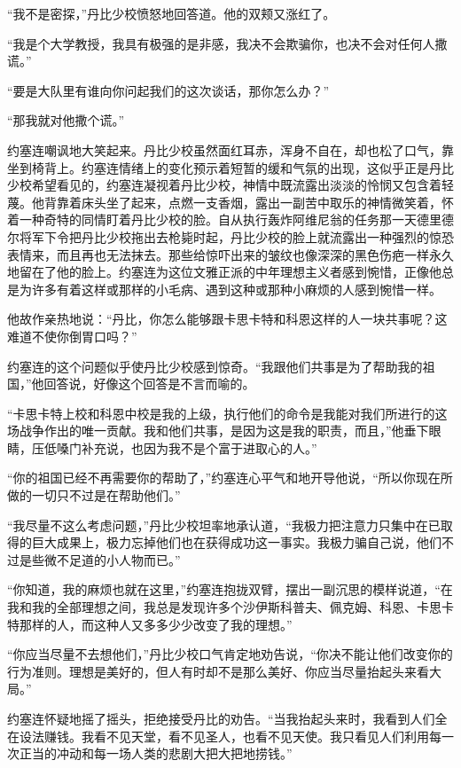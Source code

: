     “我不是密探，”丹比少校愤怒地回答道。他的双颊又涨红了。

    “我是个大学教授，我具有极强的是非感，我决不会欺骗你，也决不会对任何人撒谎。”

    “要是大队里有谁向你问起我们的这次谈话，那你怎么办？”

    “那我就对他撒个谎。”

    约塞连嘲讽地大笑起来。丹比少校虽然面红耳赤，浑身不自在，却也松了口气，靠坐到椅背上。约塞连情绪上的变化预示着短暂的缓和气氛的出现，这似乎正是丹比少校希望看见的，约塞连凝视着丹比少校，神情中既流露出淡淡的怜悯又包含着轻蔑。他背靠着床头坐了起来，点燃一支香烟，露出一副苦中取乐的神情微笑着，怀着一种奇特的同情盯着丹比少校的脸。自从执行轰炸阿维尼翁的任务那一天德里德尔将军下令把丹比少校拖出去枪毙时起，丹比少校的脸上就流露出一种强烈的惊恐表情来，而且再也无法抹去。那些给惊吓出来的皱纹也像深深的黑色伤疤一样永久地留在了他的脸上。约塞连为这位文雅正派的中年理想主义者感到惋惜，正像他总是为许多有着这样或那样的小毛病、遇到这种或那种小麻烦的人感到惋惜一样。

    他故作亲热地说：“丹比，你怎么能够跟卡思卡特和科恩这样的人一块共事呢？这难道不使你倒胃口吗？”

    约塞连的这个问题似乎使丹比少校感到惊奇。“我跟他们共事是为了帮助我的祖国，”他回答说，好像这个回答是不言而喻的。

    “卡思卡特上校和科恩中校是我的上级，执行他们的命令是我能对我们所进行的这场战争作出的唯一贡献。我和他们共事，是因为这是我的职责，而且，”他垂下眼睛，压低嗓门补充说，也因为我不是个富于进取心的人。”
 


    “你的祖国已经不再需要你的帮助了，”约塞连心平气和地开导他说，“所以你现在所做的一切只不过是在帮助他们。”

    “我尽量不这么考虑问题，”丹比少校坦率地承认道，“我极力把注意力只集中在已取得的巨大成果上，极力忘掉他们也在获得成功这一事实。我极力骗自己说，他们不过是些微不足道的小人物而已。”

    “你知道，我的麻烦也就在这里，”约塞连抱拢双臂，摆出一副沉思的模样说道，“在我和我的全部理想之间，我总是发现许多个沙伊斯科普夫、佩克姆、科恩、卡思卡特那样的人，而这种人又多多少少改变了我的理想。”

    “你应当尽量不去想他们，”丹比少校口气肯定地劝告说，“你决不能让他们改变你的行为准则。理想是美好的，但人有时却不是那么美好、你应当尽量抬起头来看大局。”

    约塞连怀疑地摇了摇头，拒绝接受丹比的劝告。“当我抬起头来时，我看到人们全在设法赚钱。我看不见天堂，看不见圣人，也看不见天使。我只看见人们利用每一次正当的冲动和每一场人类的悲剧大把大把地捞钱。”

